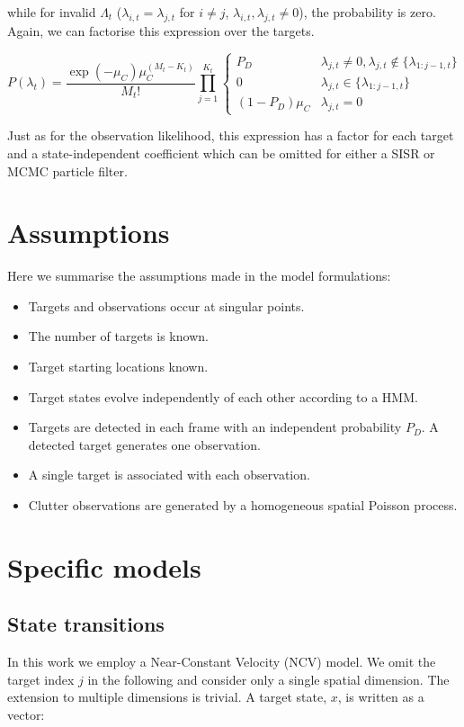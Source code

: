 while for invalid $\Lambda_t$ ($\lambda_{i,t}=\lambda_{j,t}$ for $i \ne j$, $\lambda_{i,t},\lambda_{j,t} \ne 0$), the probability is zero. Again, we can factorise this expression over the targets.

\begin{equation}
P(\lambda_t) = \frac{\exp(-\mu_C) \mu_C^{(M_t-K_t)}}{M_t!} \prod_{j=1}^{K_t} \begin{cases} P_D & \lambda_{j,t} \ne 0, \lambda_{j,t} \notin \{ \lambda_{1:j-1,t} \} \\ 0 & \lambda_{j,t} \in \{ \lambda_{1:j-1,t} \} \\ (1-P_D) \mu_C & \lambda_{j,t}=0 \end{cases}
\label{eq:MTFactorisedAssociationLikelihood}
\end{equation}

Just as for the observation likelihood, this expression has a factor for each target and a state-independent coefficient which can be omitted for either a SISR or MCMC particle filter.



\section{Assumptions}
Here we summarise the assumptions made in the model formulations:

\begin{itemize}
	\item Targets and observations occur at singular points.
	\item The number of targets is known.
	\item Target starting locations known.
	\item Target states evolve independently of each other according to a HMM.
	\item Targets are detected in each frame with an independent probability $P_D$. A detected target generates one observation.
	\item A single target is associated with each observation.
	\item Clutter observations are generated by a homogeneous spatial Poisson process.
\end{itemize}



\section{Specific models}

\subsection{State transitions}
In this work we employ a Near-Constant Velocity (NCV) model. We omit the target index $j$ in the following and consider only a single spatial dimension. The extension to multiple dimensions is trivial. A target state, $x$, is written as a vector:

